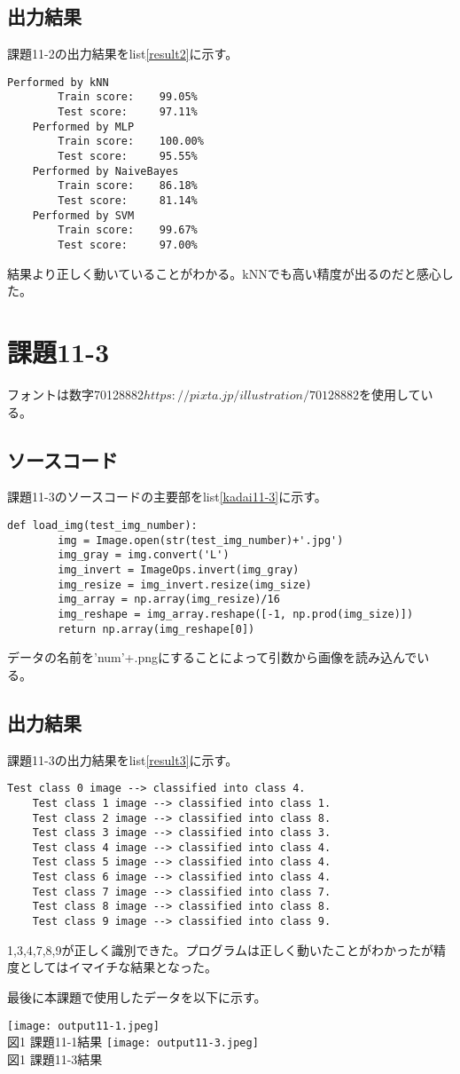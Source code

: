\documentclass[a4paper]{ltjsarticle}
\begin{document}
\subsection*{出力結果}
課題11-2の出力結果をlist\ref{result2}に示す。
\begin{lstlisting}[caption=output, label=result2]
    Performed by kNN
        Train score:    99.05%
        Test score:     97.11%
    Performed by MLP
        Train score:    100.00%
        Test score:     95.55%
    Performed by NaiveBayes
        Train score:    86.18%
        Test score:     81.14%
    Performed by SVM
        Train score:    99.67%
        Test score:     97.00%
\end{lstlisting}
結果より正しく動いていることがわかる。kNNでも高い精度が出るのだと感心した。
\newpage

\section*{課題11-3}
フォントは数字70128882\( https://pixta.jp/illustration/70128882 \)を使用している。
\subsection*{ソースコード}
課題11-3のソースコードの主要部をlist\ref{kadai11-3}に示す。
\begin{lstlisting}[caption=kadai11-3.py,label=kadai11-3]
    def load_img(test_img_number):
        img = Image.open(str(test_img_number)+'.jpg')
        img_gray = img.convert('L')
        img_invert = ImageOps.invert(img_gray)
        img_resize = img_invert.resize(img_size)
        img_array = np.array(img_resize)/16
        img_reshape = img_array.reshape([-1, np.prod(img_size)])
        return np.array(img_reshape[0])
\end{lstlisting}
データの名前を'num'+.pngにすることによって引数から画像を読み込んでいる。

\subsection*{出力結果}
課題11-3の出力結果をlist\ref{result3}に示す。
\begin{lstlisting}[caption=output, label=result3]
    Test class 0 image --> classified into class 4.
    Test class 1 image --> classified into class 1.
    Test class 2 image --> classified into class 8.
    Test class 3 image --> classified into class 3.
    Test class 4 image --> classified into class 4.
    Test class 5 image --> classified into class 4.
    Test class 6 image --> classified into class 4.
    Test class 7 image --> classified into class 7.
    Test class 8 image --> classified into class 8.
    Test class 9 image --> classified into class 9.
\end{lstlisting}
1,3,4,7,8,9が正しく識別できた。プログラムは正しく動いたことがわかったが精度としてはイマイチな結果となった。

最後に本課題で使用したデータを以下に示す。
\begin{center}
    \texttt{[image: output11-1.jpeg]} \\
    図1 課題11-1結果
    \texttt{[image: output11-3.jpeg]} \\
    図1 課題11-3結果
\end{center}
\end{document}
